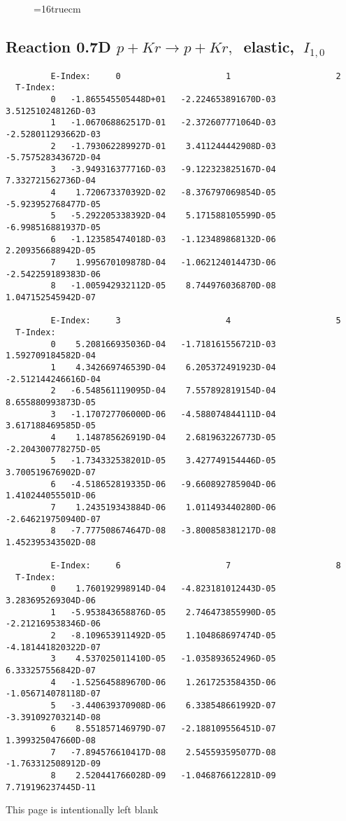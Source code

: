 \documentclass[12pt]{article}
\begin{document}
\begin{figure} \label{0.7T}
\epsfxsize=16truecm
\end{figure}
\newpage

\subsection{
Reaction 0.7D  $p + Kr \rightarrow p + Kr ,\ $
 elastic, $\  I_{1,0}$
}

\begin{small}\begin{verbatim}
         E-Index:     0                     1                     2
  T-Index:
         0   -1.865545505448D+01   -2.224653891670D-03    3.512510248126D-03
         1   -1.067068862517D-01   -2.372607771064D-03   -2.528011293662D-03
         2   -1.793062289927D-01    3.411244442908D-03   -5.757528343672D-04
         3   -3.949316377716D-03   -9.122323825167D-04    7.332721562736D-04
         4    1.720673370392D-02   -8.376797069854D-05   -5.923952768477D-05
         5   -5.292205338392D-04    5.171588105599D-05   -6.998516881937D-05
         6   -1.123585474018D-03   -1.123489868132D-06    2.209356688942D-05
         7    1.995670109878D-04   -1.062124014473D-06   -2.542259189383D-06
         8   -1.005942932112D-05    8.744976036870D-08    1.047152545942D-07
 
         E-Index:     3                     4                     5
  T-Index:
         0    5.208166935036D-04   -1.718161556721D-03    1.592709184582D-04
         1    4.342669746539D-04    6.205372491923D-04   -2.512144246616D-04
         2   -6.548561119095D-04    7.557892819154D-04    8.655880993873D-05
         3   -1.170727706000D-06   -4.588074844111D-04    3.617188469585D-05
         4    1.148785626919D-04    2.681963226773D-05   -2.204300778275D-05
         5   -1.734332538201D-05    3.427749154446D-05    3.700519676902D-07
         6   -4.518652819335D-06   -9.660892785904D-06    1.410244055501D-06
         7    1.243519343884D-06    1.011493440280D-06   -2.646219750940D-07
         8   -7.777508674647D-08   -3.800858381217D-08    1.452395343502D-08
 
         E-Index:     6                     7                     8
  T-Index:
         0    1.760192998914D-04   -4.823181012443D-05    3.283695269304D-06
         1   -5.953843658876D-05    2.746473855990D-05   -2.212169538346D-06
         2   -8.109653911492D-05    1.104868697474D-05   -4.181441820322D-07
         3    4.537025011410D-05   -1.035893652496D-05    6.333257556842D-07
         4   -1.525645889670D-06    1.261725358435D-06   -1.056714078118D-07
         5   -3.440639370908D-06    6.338548661992D-07   -3.391092703214D-08
         6    8.551857146979D-07   -2.188109556451D-07    1.399325047660D-08
         7   -7.894576610417D-08    2.545593595077D-08   -1.763312508912D-09
         8    2.520441766028D-09   -1.046876612281D-09    7.719196237445D-11

\end{verbatim}\end{small}
\newpage
This page is intentionally left blank
\newpage
\end{document}
